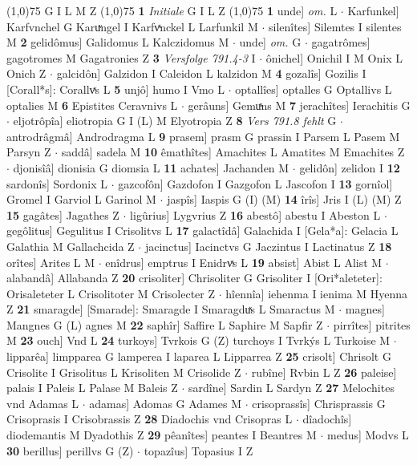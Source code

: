 \documentclass[8pt,a4paper,notitlepage]{article}
\begin{document}
\begin{table}[ht]
\begin{minipage}[t]{0.5\linewidth}
\begin{tabular}{rl}
\end{tabular}
\scriptsize
\line(1,0){75} \newline
G I L M Z \newline
\line(1,0){75} \newline
\textbf{1} \textit{Initiale} G I L Z  \newline
\line(1,0){75} \newline
\textbf{1} unde] \textit{om.} L  $\cdot$ Karfunkel] Karfvnchel G Karuͮngel I Karfvͯnckel L Larfunkil M  $\cdot$ silenîtes] Silemtes I silentes M \textbf{2} gelidômus] Galidomus L Kalczidomus M  $\cdot$ unde] \textit{om.} G  $\cdot$ gagatrômes] gagotromes M Gagatronies Z \textbf{3} \textit{Versfolge 791.4-3} I   $\cdot$ ônichel] Onichil I M Onix L Onich Z  $\cdot$ galcidôn] Galzidon I Caleidon L kalzidon M \textbf{4} gozalîs] Gozilis I [Corall*s]: Corallvͯs L \textbf{5} unjô] humo I Vmo L  $\cdot$ optallîes] optalles G Optallivs L optalies M \textbf{6} Epistites Ceravnivs L  $\cdot$ gerâuns] Gemuͯns M \textbf{7} jerachîtes] Ierachitis G  $\cdot$ eljotrôpîa] eliotropia G I (L) M Elyotropia Z \textbf{8} \textit{Vers 791.8 fehlt} G   $\cdot$ antrodrâgmâ] Androdragma L \textbf{9} prasem] prasm G prassin I Parsem L Pasem M Parsyn Z  $\cdot$ saddâ] sadela M \textbf{10} êmathîtes] Amachites L Amatites M Emachites Z  $\cdot$ djonisîâ] dionisia G diomsia L \textbf{11} achates] Jachanden M  $\cdot$ gelidôn] zelidon I \textbf{12} sardonîs] Sordonix L  $\cdot$ gazcofôn] Gazdofon I Gazgofon L Jascofon I \textbf{13} gornîol] Gromel I Garviol L Garinol M  $\cdot$ jaspîs] Iaspis G (I) (M) \textbf{14} îrîs] Jris I (L) (M) Z \textbf{15} gagâtes] Jagathes Z  $\cdot$ ligûrius] Lygvrius Z \textbf{16} abestô] abestu I Abeston L  $\cdot$ gegôlitus] Gegulitus I Crisolitvs L \textbf{17} galactîdâ] Galachida I [Gela*a]: Gelacia L Galathia M Gallachcida Z  $\cdot$ jacinctus] Iacinctvs G Jaczintus I Lactinatus Z \textbf{18} orîtes] Arites L M  $\cdot$ enîdrus] emptrus I Enidrvͯs L \textbf{19} absist] Abist L Alist M  $\cdot$ alabandâ] Allabanda Z \textbf{20} crisoliter] Chrisoliter G Grisoliter I [Ori*aleteter]: Orisaleteter L Crisolitoter M Crisolecter Z  $\cdot$ hîennîa] iehenma I ienima M Hyenna Z \textbf{21} smaragde] [Smarade]: Smaragde I Smaragduͯs L Smaractus M  $\cdot$ magnes] Mangnes G (L) agnes M \textbf{22} saphîr] Saffire L Saphire M Sapfir Z  $\cdot$ pirrîtes] pitrites M \textbf{23} ouch] Vnd L \textbf{24} turkoys] Tvrkois G (Z) turchoys I Tvrkýs L Turkoise M  $\cdot$ lipparêa] limpparea G lamperea I laparea L Lipparrea Z \textbf{25} crisolt] Chrisolt G Crisolite I Grisolitus L Krisoliten M Crisolide Z  $\cdot$ rubîne] Rvbin L Z \textbf{26} paleise] palais I Paleis L Palase M Baleis Z  $\cdot$ sardîne] Sardin L Sardyn Z \textbf{27} Melochites vnd Adamas L  $\cdot$ adamas] Adomas G Adames M  $\cdot$ crisoprassîs] Chrisprassis G Crisoprasis I Crisobrassis Z \textbf{28} Diadochis vnd Crisopras L  $\cdot$ dîadochîs] diodemantis M Dyadothis Z \textbf{29} pêanîtes] peantes I Beantres M  $\cdot$ medus] Modvs L \textbf{30} berillus] perillvs G (Z)  $\cdot$ topazîus] Topasius I Z \newline

\end{minipage}
\end{table}
\end{document}
